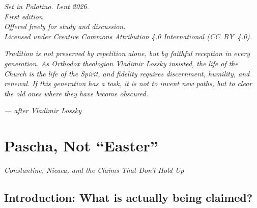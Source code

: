 \documentclass[10pt,twoside,openany]{book}
\begin{document}
\thispagestyle{empty}
\vspace*{\fill}
\begin{center}
{\small\itshape Set in Palatino. Lent 2026.\\[4pt]
First edition.\\[8pt]
Offered freely for study and discussion.\\[4pt]
Licensed under Creative Commons Attribution 4.0 International (CC~BY~4.0).}
\end{center}
\vspace*{\fill}
\clearpage

\thispagestyle{empty}
\begin{quoting}
\itshape
Tradition is not preserved by repetition alone,
but by faithful reception in every generation.
As Orthodox theologian Vladimir Lossky insisted,
the life of the Church is the life of the Spirit,
and fidelity requires discernment, humility,
and renewal. If this generation has a task,
it is not to invent new paths, but to clear
the old ones where they have become obscured.
\end{quoting}
\begin{flushright}
\small\textit{--- after Vladimir Lossky}
\end{flushright}
\clearpage

\tableofcontents
\clearpage



\chapter{Pascha, Not ``Easter''}
\begin{center}
{\itshape\color{burgundy} Constantine, Nicaea, and the Claims That Don't Hold Up}
\end{center}

\section{Introduction: What is actually being claimed?}
\end{document}
